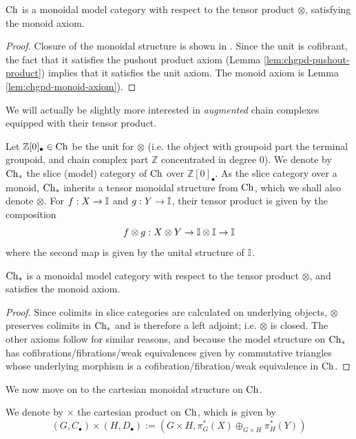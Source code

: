 \documentclass[12pt]{amsart}
\begin{document}
\begin{theorem}\label{thm:chgpd-monoidal-model-for-tensor}
	${\mathrm{Ch}}$ is a monoidal model category with respect to the tensor product $\otimes$, satisfying the monoid axiom. 
\end{theorem}
\begin{proof}
	Closure of the monoidal structure is shown in \cite[Chapter 9]{Brown_Higgins_Sivera_2011}. 
	Since the unit is cofibrant, the fact that it satisfies the pushout product axiom (Lemma \ref{lem:chgpd-pushout-product}) implies that it satisfies the unit axiom. The monoid axiom is Lemma \ref{lem:chgpd-monoid-axiom}).
\end{proof}
We will actually be slightly more interested in \textit{augmented} chain complexes equipped with their tensor product.
\begin{definition}\label{dfn:augmented-chgpd}
	Let $\mathbb{Z}[0]_\bullet \in {\mathrm{Ch}}$ be the unit for $\otimes$ (i.e. the object with groupoid part the terminal groupoid, and chain complex part $\mathbb{Z}$ concentrated in degree $0$).
	We denote by $\mathrm{Ch}_{*}$ the slice (model) category of ${\mathrm{Ch}}$ over $\mathbb{Z}[0]_\bullet$.
	As the slice category over a monoid, $\mathrm{Ch}_{*}$ inherits a tensor monoidal structure from ${\mathrm{Ch}}$, which we shall also denote $\otimes$. For $f: X \to \mathbb{I}$ and $g: Y \to \mathbb{I}$, their tensor product is given by the composition
	$$f \otimes g: X  \otimes Y \to \mathbb{I} \otimes \mathbb{I} \to \mathbb{I}$$
	where the second map is given by the unital structure of $\mathbb{I}$. 
\end{definition}
\begin{theorem}\label{thm:chaug-monoidal-model-for-tensor}
	$\mathrm{Ch}_{*}$ is a monoidal model category with respect to the tensor product $\otimes$, and satisfies the monoid axiom.
\end{theorem}
\begin{proof}
	Since colimits in slice categories are calculated on underlying objects, $\otimes$ preserves colimits in $\mathrm{Ch}_{*}$ and is therefore a left adjoint; i.e. $\otimes$ is closed.
	The other axioms follow for similar reasons, and because the model structure on $\mathrm{Ch}_{*}$ has cofibrations/fibrations/weak equivalences given by commutative triangles whose underlying morphism is a cofibration/fibration/weak equivalence in ${\mathrm{Ch}}$.
\end{proof}
We now move on to the cartesian monoidal structure on ${\mathrm{Ch}}$. 
\begin{definition}
	We denote by $\times$ the cartesian product on ${\mathrm{Ch}}$, which is given by
	$$(G,C_\bullet) \times (H, D_\bullet) := (G \times H, \pi_G^*(X) \oplus_{G \times H} \pi_H^*(Y))$$
\end{definition}
\end{document}
